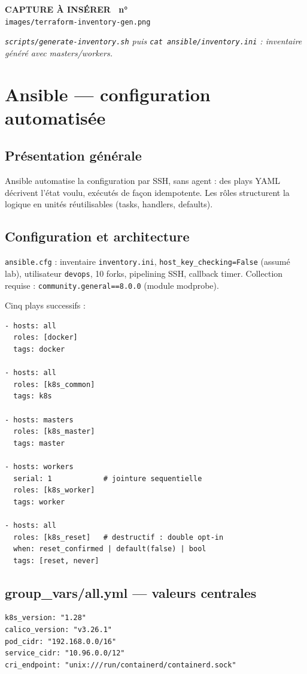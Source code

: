 \documentclass[12pt,a4paper]{article}
\newcounter{capturecount}
\newcommand{\capturebox}[2]{%
\par\vspace{4mm}
\begin{tcolorbox}[enhanced,colback=yellow!5,colframe=black!55,boxrule=0.7pt,
  borderline={0.7pt}{0pt}{black!40,dashed},
  arc=2mm,left=6pt,right=6pt,top=7pt,bottom=7pt]
\centering
{\normalsize\sffamily\bfseries CAPTURE À INSÉRER \textbar\ n°\,\stepcounter{capturecount}\thecapturecount}\\[3pt]
{\large\texttt{images/#2}}\\[7pt]
\begin{minipage}{0.94\linewidth}\centering\itshape #1\end{minipage}
\end{tcolorbox}
\par\vspace{2mm}}
\begin{document}
\capturebox{\texttt{scripts/generate-inventory.sh} puis \texttt{cat ansible/inventory.ini} : inventaire généré avec masters/workers.}{terraform-inventory-gen.png}

\clearpage
\section{Ansible --- configuration automatisée}

\subsection{Présentation générale}
Ansible automatise la configuration par SSH, sans agent : des plays YAML décrivent l'état voulu, exécutés de façon idempotente. Les rôles structurent la logique en unités réutilisables (tasks, handlers, defaults).

\subsection{Configuration et architecture}
\texttt{ansible.cfg} : inventaire \texttt{inventory.ini}, \texttt{host\_key\_checking=False} (assumé lab), utilisateur \texttt{devops}, 10 forks, pipelining SSH, callback timer. Collection requise : \texttt{community.general==8.0.0} (module modprobe).

Cinq plays successifs :

\begin{lstlisting}[caption={playbook.yml --- structure globale}]
- hosts: all
  roles: [docker]
  tags: docker

- hosts: all
  roles: [k8s_common]
  tags: k8s

- hosts: masters
  roles: [k8s_master]
  tags: master

- hosts: workers
  serial: 1            # jointure sequentielle
  roles: [k8s_worker]
  tags: worker

- hosts: all
  roles: [k8s_reset]   # destructif : double opt-in
  when: reset_confirmed | default(false) | bool
  tags: [reset, never]
\end{lstlisting}

\subsection{group\_vars/all.yml --- valeurs centrales}
\begin{lstlisting}[caption={Paramètres cluster partagés par tous les rôles}]
k8s_version: "1.28"
calico_version: "v3.26.1"
pod_cidr: "192.168.0.0/16"
service_cidr: "10.96.0.0/12"
cri_endpoint: "unix:///run/containerd/containerd.sock"
\end{lstlisting}
\end{document}
